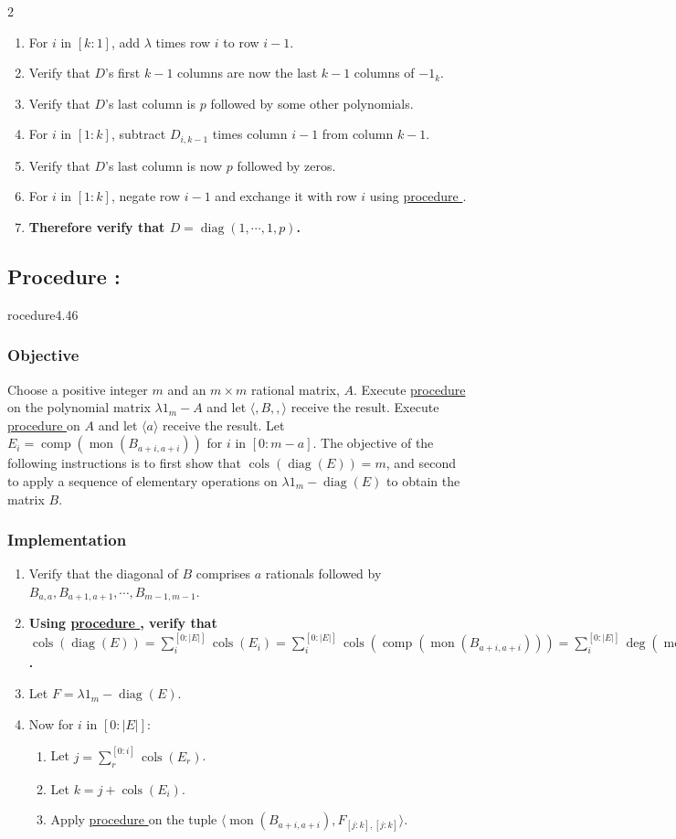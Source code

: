 \documentclass{article}
\DeclareMathOperator{\diag}{diag}
\DeclareMathOperator{\comp}{comp}
\DeclareMathOperator{\mon}{mon}
\DeclareMathOperator{\cols}{cols}
\newcounter{procedure}[part]
\newcommand{\procedure}[1]{\subsection*{Procedure \thepart:\theprocedure}\label{sec:procedure #1}\global\expandafter\edef\csname procedure#1\endcsname{\thepart:\theprocedure}\addtocounter{procedure}{1}}
\newcommand{\objective}{\subsubsection*{Objective}}
\newcommand{\implementation}{\subsubsection*{Implementation}}
\newcommand{\procedurehr}[1]{\hyperref[sec:procedure #1]{procedure \expandafter\csname procedure#1\endcsname}}
\begin{document}
\begin{multicols}{2}
\begin{enumerate}
					\item For $i$ in $[k:1]$, add $\lambda$ times row $i$ to row $i-1$.
					\item Verify that $D$'s first $k-1$ columns are now the last $k-1$ columns of $-1_k$.
					\item Verify that $D$'s last column is $p$ followed by some other polynomials.
					\item For $i$ in $[1:k]$, subtract $D_{i,k-1}$ times column $i-1$ from column $k-1$.
					\item Verify that $D$'s last column is now $p$ followed by zeros.
					\item For $i$ in $[1:k]$, negate row $i-1$ and exchange it with row $i$ using \procedurehr{4.40}.
					\item \textbf{Therefore verify that $D=\diag(1,\cdots,1,p)$.}
				\end{enumerate}
		\procedure{4.46}
			\objective
				Choose a positive integer $m$ and an $m\times m$ rational matrix, $A$. Execute \procedurehr{4.03} on the polynomial matrix $\lambda 1_m-A$ and let $\langle,B,,\rangle$ receive the result. Execute \procedurehr{4.44} on $A$ and let $\langle a\rangle$ receive the result. Let $E_i=\comp(\mon(B_{a+i,a+i}))$ for $i$ in $[0:m-a]$. The objective of the following instructions is to first show that $\cols(\diag(E))=m$, and second to apply a sequence of elementary operations on $\lambda 1_m-\diag(E)$ to obtain the matrix $B$.
			\implementation
				\begin{enumerate}
					\item Verify that the diagonal of $B$ comprises $a$ rationals followed by $B_{a,a},B_{a+1,a+1},\cdots,B_{m-1,m-1}$.
					\item \textbf{Using \procedurehr{4.45}, verify that $\cols(\diag(E))=\sum_i^{[0:{\lvert E\rvert}]}\cols(E_i)=\sum_i^{[0:{\lvert E\rvert}]}\cols(\comp(\mon(B_{a+i,a+i})))=\sum_i^{[0:{\lvert E\rvert}]}\deg(\mon(B_{a+i,a+i}))=\sum_i^{[0:{m-a}]}\deg(B_{a+i,a+i})=\sum_i^{[a:m]}\deg(B_{i,i})=m$.}
					\item Let $F=\lambda 1_m-\diag(E)$.
					\item Now for $i$ in $[0:\lvert E\rvert]$:
					\begin{enumerate}
						\item Let $j=\sum_r^{[0:{i}]}\cols(E_r)$.
						\item Let $k=j+\cols(E_i)$.
						\item Apply \procedurehr{4.45} on the tuple $\langle\mon(B_{a+i,a+i}),F_{[j:k],[j:k]}\rangle$.
					\end{enumerate}

\end{enumerate}
\end{multicols}
\end{document}

